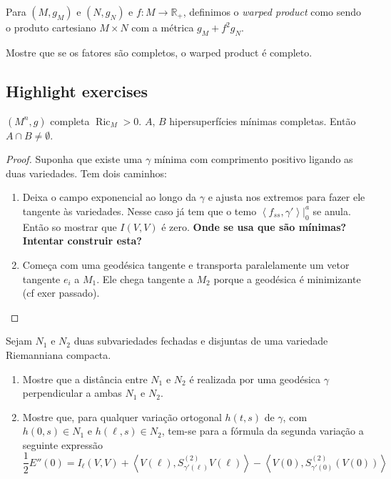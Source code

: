 \begin{exercise}
\label{exercise-wraped-product}
Para $(M,g_M)$ e $(N,g_N)$ e $f:M \to \mathbb{R}_+$, definimos o {\it warped
product} como sendo o produto cartesiano $M\times N$ com a métrica 
 $g_M+f^2g_N$.

Mostre que se os fatores são completos, o warped product é completo.
\end{exercise}

\subsection{Highlight exercises}
\label{subsection-highlight-exercises}
\begin{exercise}
\label{exercise-minimal-intersection}
$(M^n,g)$ completa $\operatorname{Ric}_M>0$. $A$, $B$ hipersuperfícies mínimas
completas. Então  $A \cap B \neq \emptyset$.
\end{exercise}

\begin{proof}
Suponha que existe uma $\gamma$ mínima com comprimento positivo ligando as 
duas variedades. Tem dois caminhos:
\begin{enumerate}
\item Deixa o campo exponencial ao longo da $\gamma$ e ajusta nos extremos
para fazer ele tangente às variedades. Nesse caso já tem que o temo
$\left<f_{ss},\gamma'\right>|_{0}^a$ se anula. Então so mostrar que $I(V,V)$  é
zero. {\bf Onde se usa que são mínimas? Intentar construir esta?}
\item Começa com uma geodésica tangente e transporta paralelamente um vetor
tangente $e_i$ a  $M_1$. Ele chega tangente a  $M_2$ porque a geodésica é
minimizante (cf exer passado).
\end{enumerate}
\end{proof}

\begin{exercise}
\label{exercise-two-submanifolds}
Sejam $N_1$ e $N_2$ duas subvariedades fechadas e disjuntas de uma variedade
Riemanniana compacta.
\begin{enumerate}
\item Mostre que a distância entre $N_1$ e $N_2$ é realizada por uma geodésica
	$\gamma$ perpendicular a ambas $N_1$ e $N_2$.
\item Mostre que, para qualquer variação ortogonal $h(t,s)$ de $\gamma$, com
$h(0,s) \in N_1$ e $h(\ell,s) \in N_2$, tem-se para a fórmula da segunda
variação a seguinte expressão
$$
\frac{1}{2}E''(0)=I_{\ell}(V,V)+
\left<V(\ell),S_{\gamma'(\ell)}^{(2)}V(\ell)\right>
-\left<V(0),S^{(2)}_{\gamma'(0)}(V(0))\right>
$$
\end{enumerate}
\end{exercise}


